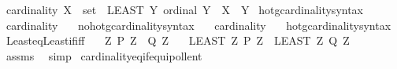 \begin{isabellebody}
\begin{isamarkuptext}
\end{isamarkuptext}\isamarkuptrue%
\isamarkupfalse%
\ {\isachardoublequoteopen}cardinality\ {\isacharparenleft}{\kern0pt}X\ {\isacharcolon}{\kern0pt}{\isacharcolon}{\kern0pt}\ set{\isacharparenright}{\kern0pt}\ {\isasymequiv}\ {\isacharparenleft}{\kern0pt}LEAST\ Y{\isachardot}{\kern0pt}\ ordinal\ Y\ {\isasymand}\ X\ {\isasymapprox}\ Y{\isacharparenright}{\kern0pt}{\isachardoublequoteclose}\isanewline
\isanewline
{}\isamarkupfalse%
\ hotg{\isacharunderscore}{\kern0pt}cardinality{\isacharunderscore}{\kern0pt}syntax\ \ \isamarkupfalse%
\ cardinality\ {\isacharparenleft}{\kern0pt}{\isachardoublequoteopen}{\isacharbar}{\kern0pt}{\isacharunderscore}{\kern0pt}{\isacharbar}{\kern0pt}{\isachardoublequoteclose}{\isacharparenright}{\kern0pt}\ \isamarkupfalse%
\isanewline
{}\isamarkupfalse%
\ no{\isacharunderscore}{\kern0pt}hotg{\isacharunderscore}{\kern0pt}cardinality{\isacharunderscore}{\kern0pt}syntax\ \ \isamarkupfalse%
\ cardinality\ {\isacharparenleft}{\kern0pt}{\isachardoublequoteopen}{\isacharbar}{\kern0pt}{\isacharunderscore}{\kern0pt}{\isacharbar}{\kern0pt}{\isachardoublequoteclose}{\isacharparenright}{\kern0pt}\ \isamarkupfalse%
\isanewline
{}\isamarkupfalse%
\ hotg{\isacharunderscore}{\kern0pt}cardinality{\isacharunderscore}{\kern0pt}syntax\isanewline
\isanewline
{}\isamarkupfalse%
\ Least{\isacharunderscore}{\kern0pt}eq{\isacharunderscore}{\kern0pt}Least{\isacharunderscore}{\kern0pt}if{\isacharunderscore}{\kern0pt}iff{\isacharcolon}{\kern0pt}\isanewline
\ \ \ {\isachardoublequoteopen}{\isasymAnd}Z{\isachardot}{\kern0pt}\ P\ Z\ {\isasymlongleftrightarrow}\ Q\ Z{\isachardoublequoteclose}\isanewline
\ \ \ {\isachardoublequoteopen}{\isacharparenleft}{\kern0pt}LEAST\ Z{\isachardot}{\kern0pt}\ P\ Z{\isacharparenright}{\kern0pt}\ {\isacharequal}{\kern0pt}\ {\isacharparenleft}{\kern0pt}LEAST\ Z{\isachardot}{\kern0pt}\ Q\ Z{\isacharparenright}{\kern0pt}{\isachardoublequoteclose}\isanewline
%
\isadelimproof
\ \ %
\endisadelimproof
%
\isatagproof
{}\isamarkupfalse%
\ assms\ \isamarkupfalse%
\ simp%
\endisatagproof
{\isafoldproof}%
%
\isadelimproof
\isanewline
%
\endisadelimproof
\isanewline
{}\isamarkupfalse%
\ cardinality{\isacharunderscore}{\kern0pt}eq{\isacharunderscore}{\kern0pt}if{\isacharunderscore}{\kern0pt}equipollent{\isacharcolon}{\kern0pt}\isanewline

\end{isabellebody}
